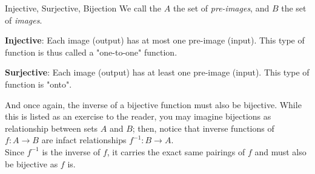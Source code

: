 \begin{ln-define}{Injective, Surjective, Bijection}{}
    We call the $A$ the set of \textit{pre-images}, and $B$ the set of \textit{images}.
    \begin{bindenum}
        \item{
            \textbf{Injective}: Each image (output) has at most one pre-image (input). This type of function is thus called a "one-to-one" function.
            \begin{center}
            \end{center}
        }
        \item{
            \textbf{Surjective}: Each image (output) has at least one pre-image (input). This type of function is "onto".
            \begin{center}
            \end{center}
        }
    \end{bindenum}
\end{ln-define}
And once again, the inverse of a bijective function must also be bijective. While this is listed as an exercise to the reader, you may imagine bijections as relationship between sets $A$ and $B$; then, notice that inverse functions of $f: A \rightarrow B$ are infact relationships $f^{-1}: B \rightarrow A$. \\
Since $f^{-1}$ is the inverse of $f$, it carries the exact same pairings of $f$ and must also be bijective as $f$ is.

